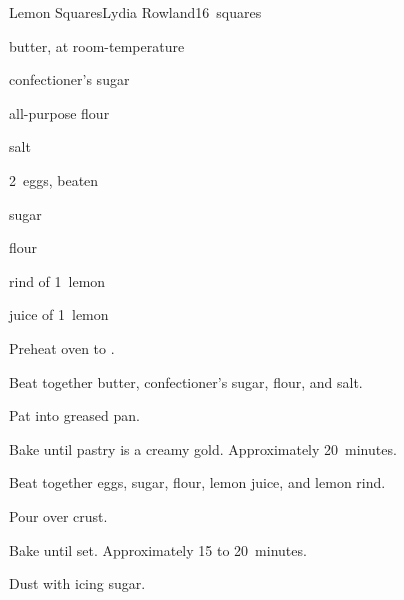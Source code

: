 \begin{recipe}{Lemon Squares}{Lydia Rowland}{16~squares}

\begin{ingredients}
\item \C{\half} butter, at room-temperature
\item \C{\quarter} confectioner's sugar
\item {} all-purpose flour
\item \tp{\half} salt
\item 2~eggs, beaten
\item {} sugar
\item {} flour
\item rind of 1~lemon
\item juice of 1~lemon
\end{ingredients}

\begin{directions}
\item Preheat oven to .
\item Beat together butter, confectioner's sugar,  flour, and salt.
\item Pat into  greased pan.
\item Bake until pastry is a creamy gold. Approximately 20~minutes.
\item Beat together eggs, sugar,  flour, lemon juice, and lemon rind.
\item Pour over crust.
\item Bake until set. Approximately 15 to 20~minutes.
\item Dust with icing sugar.
\end{directions}

\end{recipe}

